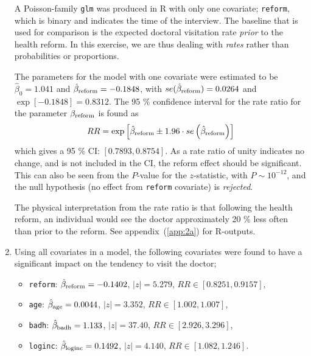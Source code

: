 \documentclass[a4paper,11pt]{article}
\begin{document}
\begin{enumerate}[label=2\alph*)]
        A Poisson-family \texttt{glm} was produced in R with only one covariate; \texttt{reform}, which is binary and indicates the time of the interview. The baseline that is used for comparison is the expected doctoral visitation rate \textit{prior} to the health reform. In this exercise, we are thus dealing with \textit{rates} rather than probabilities or proportions.

        The parameters for the model with one covariate were estimated to be $\hat{\beta}_0 = 1.041$ and $\hat{\beta}_{\rm reform} = -0.1848$, with $se(\hat{\beta}_{\rm reform}) = 0.0264$ and $\exp\left[ -0.1848 \right] = 0.8312$. The 95 \% confidence interval for the rate ratio for the parameter $\beta_{\rm reform}$ is found as
        \begin{equation}
            RR = \exp \left[ \hat{\beta}_{\rm reform} \pm 1.96 \cdot se\left( \hat{\beta}_{\rm reform} \right) \right]
            \label{eq:rate_ratio_CI}
        \end{equation}
        which gives a 95 \% CI: $[0.7893, 0.8754]$. As a rate ratio of unity indicates no change, and is not included in the CI, the reform effect should be significant. This can also be seen from the $P$-value for the $z$-statistic, with $P\sim 10^{-12}$, and the null hypothesis (no effect from \texttt{reform} covariate) is \textit{rejected}. 

        The physical interpretation from the rate ratio is that following the health reform, an individual would see the doctor approximately 20 \% less often than prior to the reform. See appendix~(\ref{app:2a}) for R-outputs.

    \item Using all covariates in a model, the following covariates were found to have a significant impact on the tendency to visit the doctor;
        \begin{itemize}
            \item \texttt{reform}: $\hat{\beta}_{\rm reform} = -0.1402$, $|z| = 5.279$, $RR \in [0.8251, 0.9157]$,
            \item \texttt{age}: $\hat{\beta}_{\rm age} = 0.0044$, $|z| = 3.352$, $RR \in [1.002, 1.007]$, 
            \item \texttt{badh}: $\hat{\beta}_{\rm badh} = 1.133$, $|z| = 37.40$, $RR \in [2.926, 3.296]$,
            \item \texttt{loginc}: $\hat{\beta}_{\rm loginc} = 0.1492$, $|z| = 4.140$, $RR \in [1.082, 1.246]$.
        \end{itemize}


\end{enumerate}
\end{document}
